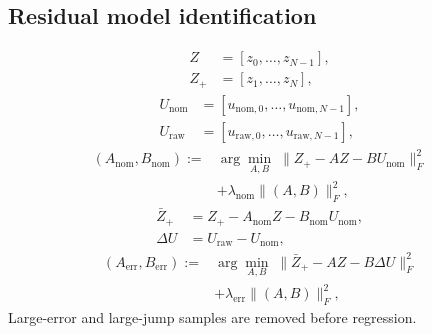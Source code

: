 \documentclass{article}
\begin{document}
\subsection{Residual model identification}
\begin{equation}
\begin{aligned}
Z &= [z_0,\dots,z_{N-1}],\\
Z_{+} &= [z_1,\dots,z_N],
\end{aligned}
\label{eq:snapshot_z}
\end{equation}
\begin{equation}
\begin{aligned}
U_{\mathrm{nom}} &= [u_{\mathrm{nom},0},\dots,u_{\mathrm{nom},N-1}],\\
U_{\mathrm{raw}} &= [u_{\mathrm{raw},0},\dots,u_{\mathrm{raw},N-1}],
\end{aligned}
\label{eq:snapshot_u}
\end{equation}
\begin{equation}
\begin{aligned}
\left(A_{\mathrm{nom}},B_{\mathrm{nom}}\right)
:= {}&\arg\min_{A,B}\;
\|Z_{+}-AZ-BU_{\mathrm{nom}}\|_F^2 \\
&+ \lambda_{\mathrm{nom}}\|(A,B)\|_F^2,
\end{aligned}
\label{eq:stage1}
\end{equation}
\begin{equation}
\begin{aligned}
\bar{Z}_{+} &= Z_{+}-A_{\mathrm{nom}}Z-B_{\mathrm{nom}}U_{\mathrm{nom}},\\
\Delta U &= U_{\mathrm{raw}}-U_{\mathrm{nom}},
\end{aligned}
\label{eq:residualdata}
\end{equation}
\begin{equation}
\begin{aligned}
\left(A_{\mathrm{err}},B_{\mathrm{err}}\right)
:= {}&\arg\min_{A,B}\;
\|\bar{Z}_{+}-AZ-B\Delta U\|_F^2 \\
&+ \lambda_{\mathrm{err}}\|(A,B)\|_F^2,
\end{aligned}
\label{eq:stage2}
\end{equation}
Large-error and large-jump samples are removed before regression.
\end{document}
